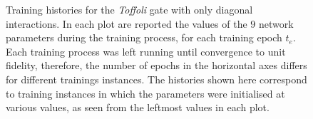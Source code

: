 \begin{figure}[tb]
	\centering
	\caption{
		Training histories for the \emph{Toffoli} gate with only diagonal interactions.
		In each plot are reported the values of the $9$ network parameters during the training process, for each training epoch $t_e$.
		Each training process was left running until convergence to unit fidelity, therefore, the number of epochs in the horizontal axes differs for different trainings instances.
		The histories shown here correspond to training instances in which the parameters were initialised at various values, as seen from the leftmost values in each plot.
	}
	\label{fig:GL:toffoli_diagonal_parhistories}
\end{figure}
 

